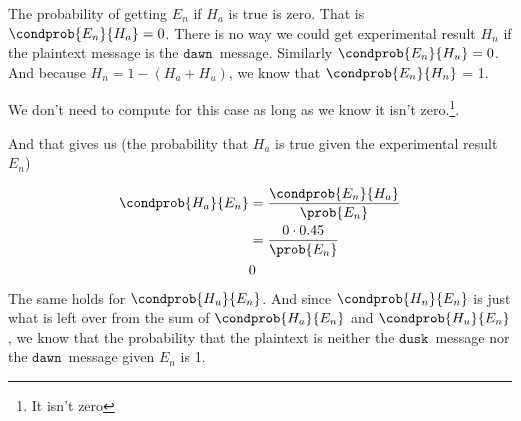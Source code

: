 \documentclass{article}
\newcommand\mdusk{\ensuremath{\mathtt{dusk}}}
\newcommand\mdawn{\ensuremath{\mathtt{dawn}}}
\begin{document}
The probability of getting $E_n$ if $H_a$ is true is zero. That is
$\condprob{E_n}{H_a} = 0$.
There is no way we could get experimental result $H_n$ if the plaintext message is the \mdawn\ message.
Similarly 
$\condprob{E_n}{H_u} = 0$.
And because $H_n = 1 - (H_a + H_u)$, we know that $\condprob{E_n}{H_n}$ = 1.

We don't need to compute  for this case as long as we know it isn't zero.\footnote{It isn't zero}.

And that gives us  (the probability that $H_a$ is true given the experimental result $E_n$)

\begin{align*}
    \condprob{H_a}{E_n} &= \frac{\condprob{E_n}{H_a}}{\prob{E_n}} \\
                        &= \frac{0 \cdot 0.45}{\prob{E_n}} \\
                        & 0 
\end{align*}
The same holds for $\condprob{H_u}{E_n}$. And since $\condprob{H_n}{E_n}$ is just what is left over from the sum of  $\condprob{H_a}{E_n}$ and $\condprob{H_u}{E_n}$, we know that the probability that the plaintext is neither the \mdusk\ message nor the \mdawn\ message given $E_n$ is 1.
\end{document}
